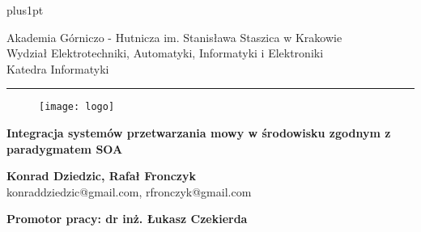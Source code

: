 \documentclass[a4paper, twoside,11pt, openright]{Latex/Classes/PhDthesisPSnPDF}
\begin{document}
\def\tablename{Tabela}
\def\listtablename{Spis tabel}%


\renewcommand\baselinestretch{1.2}
\baselineskip=18pt plus1pt

\renewcommand*{\lstlistingname}{Fragment kodu}




\thispagestyle{empty}

\begin{center}
Akademia Górniczo - Hutnicza im. Stanisława Staszica w Krakowie \\
Wydział Elektrotechniki, Automatyki, Informatyki i Elektroniki \\
Katedra Informatyki
\rule{\textwidth}{.1mm}
\end{center}

\begin{figure}[hkp!]
 \centering
 \texttt{[image: logo]}
 \label{fig:orzel_agh}
\end{figure}

\begin{center}

\vskip 10pt
{\bf \Large Integracja systemów przetwarzania mowy w środowisku zgodnym z paradygmatem SOA}
\end{center}

\vskip 60pt
\begin{center}
{\Large \bf Konrad Dziedzic, Rafał Fronczyk}\\
{konraddziedzic@gmail.com, rfronczyk@gmail.com}
\end{center}

\vskip 50pt
\begin{center}
{\bf
    Promotor pracy: dr inż. Łukasz Czekierda
}
\end{center}
\end{document}
